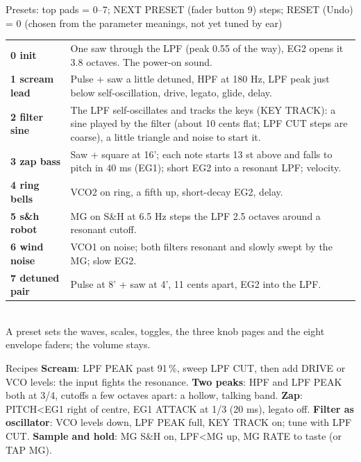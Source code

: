 \documentclass{article}
\begin{document}
\vspace{1.5mm}
\begin{minipage}[t]{150mm}\vspace{0pt}
\begin{card}{Presets: top pads = 0--7; NEXT PRESET (fader button 9) steps; RESET (Undo) = 0 \quad\textmd{\fontsize{6.5}{7}\selectfont (chosen from the parameter meanings, not yet tuned by ear)}}
\fontsize{7.2}{8.7}\selectfont
\begin{tabularx}{\linewidth}{@{}>{\bfseries}l L@{}}
0 init & One saw through the LPF (peak 0.55 of the way), EG2 opens it 3.8 octaves. The power-on sound. \\
1 scream lead & Pulse + saw a little detuned, HPF at 180 Hz, LPF peak just below self-oscillation, drive, legato, glide, delay. \\
2 filter sine & The LPF self-oscillates and tracks the keys (KEY TRACK): a sine played by the filter (about 10 cents flat; LPF CUT steps are coarse), a little triangle and noise to start it. \\
3 zap bass & Saw + square at 16'; each note starts 13 st above and falls to pitch in 40 ms (EG1); short EG2 into a resonant LPF; velocity. \\
4 ring bells & VCO2 on ring, a fifth up, short-decay EG2, delay. \\
5 s\&h robot & MG on S\&H at 6.5 Hz steps the LPF 2.5 octaves around a resonant cutoff. \\
6 wind noise & VCO1 on noise; both filters resonant and slowly swept by the MG; slow EG2. \\
7 detuned pair & Pulse at 8' + saw at 4', 11 cents apart, EG2 into the LPF. \\
\end{tabularx}\\[0.3mm]
A preset sets the waves, scales, toggles, the three knob pages and the eight envelope faders; the volume stays.
\end{card}

\begin{card}{Recipes}
\fontsize{7.4}{9.0}\selectfont
\textbf{Scream}: LPF PEAK past 91\,\%, sweep LPF CUT, then add DRIVE or VCO levels: the input fights the
resonance.\quad
\textbf{Two peaks}: HPF and LPF PEAK both at 3/4, cutoffs a few octaves apart: a hollow, talking band.\quad
\textbf{Zap}: PITCH<EG1 right of centre, EG1 ATTACK at 1/3 (20 ms), legato off.\quad
\textbf{Filter as oscillator}: VCO levels down, LPF PEAK full, KEY TRACK on; tune with LPF CUT.\quad
\textbf{Sample and hold}: MG S\&H on, LPF<MG up, MG RATE to taste (or TAP MG).
\end{card}
\end{minipage}\hfill
\end{document}
